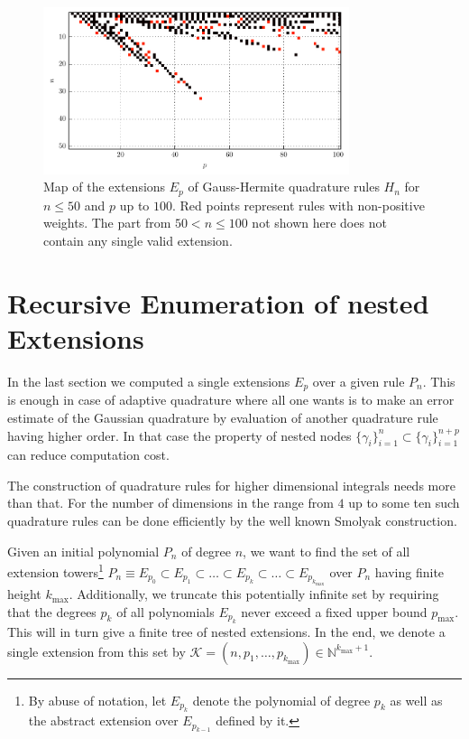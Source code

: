 \documentclass[a4paper,10pt]{article}
\begin{document}
\begin{figure}
  \centering
  \includegraphics[width=0.8\textwidth]{./img/map_herm_50_100.pdf}
  \caption{Map of the extensions $E_p$ of Gauss-Hermite quadrature rules
           $H_n$ for $n \leq 50$ and $p$ up to $100$. Red points represent
           rules with non-positive weights. The part from $50 < n \leq 100$
           not shown here does not contain any single valid extension.}
  \label{fig:map_herm_50_100}
\end{figure}


\FloatBarrier
\section{Recursive Enumeration of nested Extensions}


In the last section we computed a single extensions $E_p$ over a
given rule $P_n$. This is enough in case of adaptive quadrature where all one
wants is to make an error estimate of the Gaussian quadrature by evaluation
of another quadrature rule having higher order. In that case the property of
nested nodes $\{\gamma_i\}_{i=1}^n \subset \{\gamma_i\}_{i=1}^{n+p}$ can reduce
computation cost.

The construction of quadrature rules for higher dimensional integrals
needs more than that. For the number of dimensions in the range from $4$ up
to some ten such quadrature rules can be done efficiently by the well known
Smolyak construction.

Given an initial polynomial $P_n$ of degree $n$, we want to find the set of all
extension towers\footnote{By abuse of notation, let $E_{p_k}$ denote the polynomial
of degree $p_k$ as well as the abstract extension over $E_{p_{k-1}}$ defined by it.}
$P_n \equiv E_{p_0} \subset E_{p_1} \subset \ldots \subset E_{p_k} \subset \ldots \subset E_{p_{k_{\textrm{max}}}}$
over $P_n$ having finite height $k_{\textrm{max}}$. Additionally, we truncate this
potentially infinite set by requiring that the degrees $p_k$ of all polynomials $E_{p_k}$
never exceed a fixed upper bound $p_{\textrm{max}}$. This will in turn give a finite tree
of nested extensions. In the end, we denote a single extension from this set
by $\mathcal{K} = (n, p_1, \ldots, p_{k_{\textrm{max}}}) \in \mathbb{N}^{{k_{\textrm{max}}}+1}$.
\end{document}

